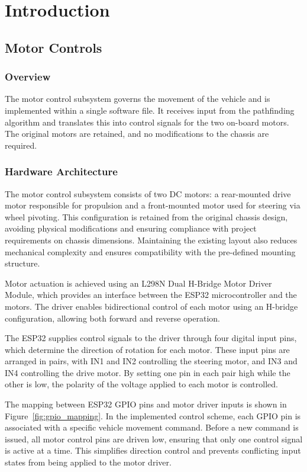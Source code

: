 \chapter{Introduction}

\section{Motor Controls}

\subsection{Overview}

The motor control subsystem governs the movement of the vehicle and is implemented within a single software file. It receives input from the pathfinding algorithm and translates this into control signals for the two on-board motors. The original motors are retained, and no modifications to the chassis are required.

\subsection{Hardware Architecture}

The motor control subsystem consists of two DC motors: a rear-mounted drive motor responsible for propulsion and a front-mounted motor used for steering via wheel pivoting. This configuration is retained from the original chassis design, avoiding physical modifications and ensuring compliance with project requirements on chassis dimensions. Maintaining the existing layout also reduces mechanical complexity and ensures compatibility with the pre-defined mounting structure.

Motor actuation is achieved using an L298N Dual H-Bridge Motor Driver Module, which provides an interface between the ESP32 microcontroller and the motors. The driver enables bidirectional control of each motor using an H-bridge configuration, allowing both forward and reverse operation.

The ESP32 supplies control signals to the driver through four digital input pins, which determine the direction of rotation for each motor. These input pins are arranged in pairs, with IN1 and IN2 controlling the steering motor, and IN3 and IN4 controlling the drive motor. By setting one pin in each pair high while the other is low, the polarity of the voltage applied to each motor is controlled.

The mapping between ESP32 GPIO pins and motor driver inputs is shown in Figure~\ref{fig:gpio_mapping}. In the implemented control scheme, each GPIO pin is associated with a specific vehicle movement command. Before a new command is issued, all motor control pins are driven low, ensuring that only one control signal is active at a time. This simplifies direction control and prevents conflicting input states from being applied to the motor driver.

